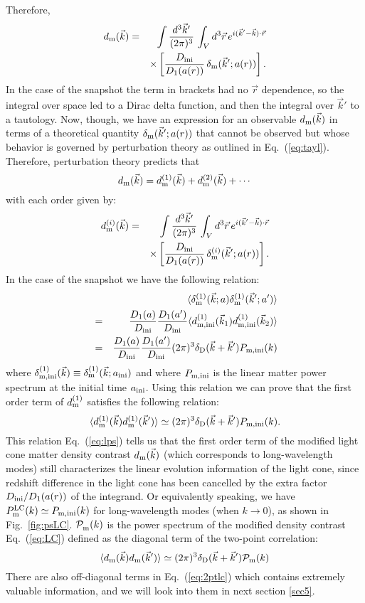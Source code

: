 \documentclass[prd,amsmath,amssymb,floatfix,superscriptaddress,nofootinbib,twocolumn]{revtex4-1}
\def\be{\begin{equation}}
\def\ee{\end{equation}}
\def\bea{\begin{eqnarray}}
\def\eea{\end{eqnarray}}
\newcommand{\ini}{\rm ini}
\newcommand{\vrr}{\vec{r}}
\newcommand{\vs}{\nonumber\\}
\newcommand{\vk}{\vec{k}}
\newcommand{\ec}[1]{Eq.~(\ref{eq:#1})}
\newcommand{\eql}[1]{\label{eq:#1}}
\newcommand{\rf}[1]{\ref{fig:#1}}
\newcommand{\peikai}[1]{{\color{blue} #1}}
\begin{document}
Therefore,
\bea
\dlc(\vk) &=&\int \frac{d^3 \vk'}{(2\pi)^3}\, \int_{V} d^3\vrr \,  e^{i(\vk'-\vk) \cdot\vrr} \vs
&&\times  \left[ \frac{D_{\ini}}{D_{1}(a(r))}  
\, \dm(\vk';a(r))\right].
\eea
In the case of the snapshot the term in brackets had no $\vrr$ dependence, so the integral over space led to a Dirac delta function, and then the integral over $\vk'$ to a tautology. Now, though, we have an expression for an observable $\dlc(\vk)$ in terms of a theoretical quantity $\dm(\vk';a(r))$ that cannot be observed but whose behavior is governed by perturbation theory as outlined in \ec{tayl}. 
Therefore, perturbation theory predicts that 
\be 
\dlc(\vk) = \dolc(\vk)+\dtlc(\vk)+\cdots
\ee 
with each order given by:
\bea
\dlc^{(i)}(\vk) &=&\int \frac{d^3 \vk'}{(2\pi)^3}\, \int_{V} d^3\vrr \,  e^{i(\vk'-\vk) \cdot\vrr} \vs
&&\times  \left[ \frac{D_{\ini}}{D_{1}(a(r))}  
\, \dm^{(i)}(\vk';a(r))\right]. \eql{exp}
\eea
\peikai{In the case of the snapshot we have the following relation:
\bea 
&&\langle \dm^{(1)}(\vk;a)\dm^{(1)}(\vk';a') \rangle \vs
&=&\frac{D_1(a)}{D_{\ini}}\frac{D_1(a')}{D_{\ini}}\langle \dmi^{(1)}(\vk_1)\dmi^{(1)}(\vk_2) \rangle \vs
&=&\frac{D_1(a)}{D_{\ini}}\frac{D_1(a')}{D_{\ini}}(2\pi)^3\delta_{\rm D}(\vk+\vk')P_{\rm m,ini}(k)
\eea 
where $\delta_{\rm m,ini}^{(1)}(\vk)\equiv\delta_{\rm m}^{(1)}(\vk;a_{\ini})$ and where $P_{\rm m,ini}$ is the linear matter power spectrum at the initial time $a_{\rm ini}$. Using this relation} we can prove that the first order term of $d^{(1)}_{\rm m}$ satisfies the following relation:
\be 
\langle d^{(\rm 1)}_{\rm m}(\vk) d^{(\rm 1)}_{\rm m}(\vk') \rangle \simeq (2\pi)^3 \delta_{\rm D}(\vk+\vk')P_{\rm m,ini}(k).\eql{lps}
\ee 
This relation \ec{lps} tells us that the first order term of the modified light cone matter density contrast $d_{\rm m}(\vk)$ (which corresponds to long-wavelength modes) still characterizes the linear evolution information of the light cone, since redshift difference in the light cone has been cancelled by the extra factor $D_{\ini}/D_{1}(a(r))$ of the integrand. Or equivalently speaking, we have $P_{\rm m}^{\rm LC}(k)\simeq P_{\rm m,ini}(k)$ for long-wavelength modes (when $k\rightarrow 0$), as shown in Fig.~\rf{psLC}. \peikai{$\mathcal{P}_{\rm m}^{}(k)$} is the power spectrum of the modified density contrast \ec{LC} defined as the diagonal term of the two-point correlation:
\be 
\langle d_{\rm m} (\vk)d_{\rm m}(\vk')\rangle \simeq (2\pi)^3 \delta_{\rm D}(\vk+\vk')\mathcal{P}_{\rm m}(k) \eql{2ptlc}
\ee 
There are also off-diagonal terms in \ec{2ptlc} which contains extremely valuable information, and we will look into them in next section \ref{sec5}.
\end{document}
